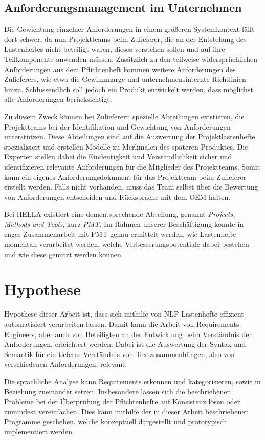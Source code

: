 \documentclass[12pt]{report}
\begin{document}
\subsection{Anforderungsmanagement im Unternehmen}
Die Gewichtung einzelner Anforderungen in einem größeren Systemkontext fällt dort schwer, da nun Projektteams beim Zulieferer, die an der Entstehung des Lastenheftes nicht beteiligt waren, dieses verstehen sollen und auf ihre Teilkomponente anwenden müssen. Zusätzlich zu den teilweise widersprüchlichen Anforderungen aus dem Pflichtenheft kommen weitere Anforderungen des Zulieferers, wie etwa die Gewinnmarge und unternehmensinternte Richtlinien hinzu. Schlussendlich soll jedoch ein Produkt entwickelt werden, dass möglichst alle Anforderungen berücksichtigt. \cite{mw02}

Zu diesem Zweck können bei Zulieferern spezielle Abteilungen existieren, die Projektteams bei der Identifikation und Gewichtung von Anforderungen unterstützen. Diese Abteilungen sind auf die Auswertung der Projektlastenhefte spezialisiert und erstellen Modelle zu Merkmalen des späteren Produktes. Die Experten stellen dabei die Eindeutigkeit und Verständlichkeit sicher und identifizieren relevante Anforderungen für die Mitglieder des Projektteams. Somit kann ein eigenes Anforderungsdokument für das Projektteam beim Zulieferer erstellt werden. 
Falls nicht vorhanden, muss das Team selbst über die Bewertung von Anforderungen entscheiden und Rücksprache mit dem OEM halten.

Bei HELLA existiert eine dementsprechende Abteilung, genannt \textit{Projects, Methods and Tools}, kurz \textit{PMT}. Im Rahmen unserer Beschäftigung konnte in enger Zusammenarbeit mit PMT genau ermittelt werden, wie Lastenhefte momentan verarbeitet werden, welche Verbesserungspotentiale dabei bestehen und wie diese genutzt werden können.

\section{Hypothese}
Hypothese dieser Arbeit ist, dass sich mithilfe von NLP Lastenhefte effizient automatisiert verarbeiten lassen. Damit kann die Arbeit von Requirements-Engineers, aber auch von Beteiligten an der Entwicklung beim Verständnis der Anforderungen, erleichtert werden. Dabei ist die Auswertung der Syntax und Semantik für ein tieferes Verständnis von Textzusammenhängen, also von verschiedenen Anforderungen, relevant.

Die sprachliche Analyse kann Requirements erkennen und kategorisieren, sowie in Beziehung zueinander setzen. Insbesondere lassen sich die beschriebenen Probleme bei der Überprüfung der Pflichtenhefte auf Konsistenz lösen oder zumindest vereinfachen. Dies kann mithilfe der in dieser Arbeit beschriebenen Programme geschehen, welche konzeptuell dargestellt und prototypisch implementiert werden. 
\end{document}
